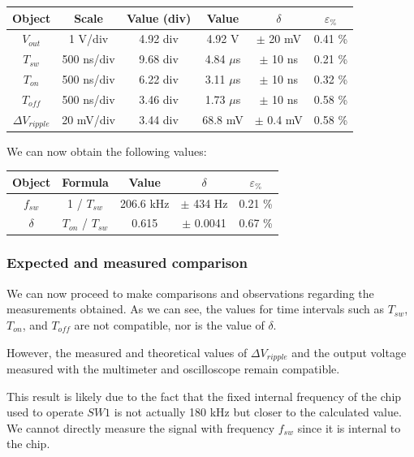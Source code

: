 \documentclass[../main.tex]{subfiles}
\begin{document}
\begin{center}
\begin{tabular}{c c c c c c}
\textbf{Object} & \textbf{Scale} & \textbf{Value (div)} & \textbf{Value} & $\delta$ & $\varepsilon_{\%}$ \\

\hline
 $V_{out}$ & 1 V/div &  4.92 div & 4.92 V & $\pm$ 20 mV & 0.41  \% \\ 
\hline
 $T_{sw}$ & 500 ns/div & 9.68 div & 4.84 $\mu$s & $\pm$ 10 ns & 0.21 \% \\ 
 \hline
$T_{on}$ & 500 ns/div & 6.22 div & 3.11 $\mu$s & $\pm$ 10 ns  & 0.32 \% \\ 
 \hline
 $T_{off}$ & 500 ns/div & 3.46 div & 1.73 $\mu$s &$\pm$ 10 ns & 0.58 \% \\ 
  \hline
 $\Delta V_{ripple}$ & 20 mV/div & 3.44 div & 68.8 mV &$\pm$ 0.4 mV & 0.58 \% \\ 
\end{tabular}
\end{center}

We can now obtain the following values:

\begin{center}
\begin{tabular}{c c c c c}
\textbf{Object} & \textbf{Formula}  & \textbf{Value} & $\delta$ & $\varepsilon_{\%}$ \\

\hline
$f_{sw}$ &  1 / $T_{sw}$ & 206.6 kHz & $\pm$ 434 Hz & 0.21 \% \\ 
\hline
$\delta$ &  $T_{on}$ / $T_{sw}$ &  0.615 & $\pm$ 0.0041 & 0.67 \% \\ 

\end{tabular}
\end{center}

\subsubsection*{Expected and measured comparison}

We can now proceed to make comparisons and observations regarding the measurements obtained.
As we can see, the values for time intervals such as $T_{sw}$, $T_{on}$, and $T_{off}$ are not compatible, nor is the value of $\delta$.

However, the measured and theoretical values of $\Delta V_{ripple}$ and the output voltage measured with the multimeter and oscilloscope remain compatible.

This result is likely due to the fact that the fixed internal frequency of the chip used to operate $SW1$ is not actually 180 kHz but closer to the calculated value. We cannot directly measure the signal with frequency $f_{sw}$ since it is internal to the chip.
\end{document}
